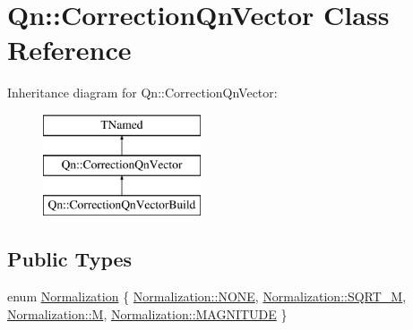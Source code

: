\hypertarget{classQn_1_1CorrectionQnVector}{}\section{Qn\+:\+:Correction\+Qn\+Vector Class Reference}
\label{classQn_1_1CorrectionQnVector}
Inheritance diagram for Qn\+:\+:Correction\+Qn\+Vector\+:\begin{figure}[H]
\begin{center}
\leavevmode
\includegraphics[height=3.000000cm]{classQn_1_1CorrectionQnVector}
\end{center}
\end{figure}
\subsection*{Public Types}
\begin{DoxyCompactItemize}
\item 
enum \mbox{\hyperlink{classQn_1_1CorrectionQnVector_a2998fe4babb716c57848c8c73b24a398}{Normalization}} \{ \mbox{\hyperlink{classQn_1_1CorrectionQnVector_a2998fe4babb716c57848c8c73b24a398ab50339a10e1de285ac99d4c3990b8693}{Normalization\+::\+N\+O\+NE}}, 
\mbox{\hyperlink{classQn_1_1CorrectionQnVector_a2998fe4babb716c57848c8c73b24a398a465f35d0481ebf03b978c3bd9eb1e5b6}{Normalization\+::\+S\+Q\+R\+T\+\_\+M}}, 
\mbox{\hyperlink{classQn_1_1CorrectionQnVector_a2998fe4babb716c57848c8c73b24a398a69691c7bdcc3ce6d5d8a1361f22d04ac}{Normalization\+::M}}, 
\mbox{\hyperlink{classQn_1_1CorrectionQnVector_a2998fe4babb716c57848c8c73b24a398aba1a4ef58204f0da36291466025d7533}{Normalization\+::\+M\+A\+G\+N\+I\+T\+U\+DE}}
 \}
\end{DoxyCompactItemize}
